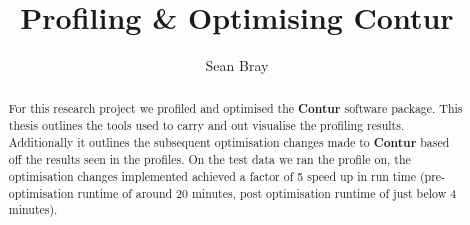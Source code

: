 \makeatletter
\renewcommand {\@degree@string} {Master of Science}
\makeatother

\title{Profiling \& Optimising Contur}
\author{Sean Bray}

\maketitle
\makedeclaration

\begin{abstract} %
For this research project we profiled and optimised the \textbf{Contur} software package. This thesis outlines the tools used to carry and out visualise the profiling results.
Additionally it outlines the subsequent optimisation changes made to \textbf{Contur} based off the results seen in the profiles. On the test data we ran the profile on, the optimisation changes
implemented achieved a factor of 5 speed up in run time (pre-optimisation runtime of around 20 minutes, post optimisation runtime of just below 4 minutes).
\end{abstract}

\setcounter{tocdepth}{2} 

\tableofcontents
\listoffigures

